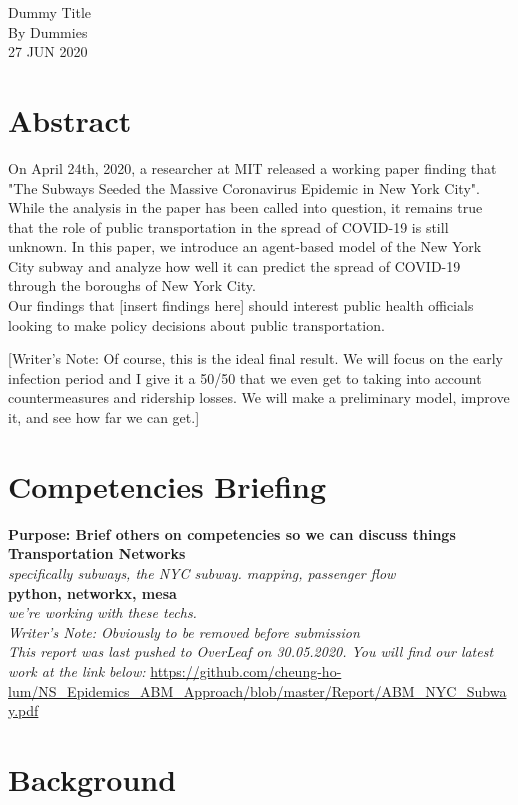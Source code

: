\documentclass[12pt, a4, epsf] {article}
\theoremstyle{plain}
\theoremstyle{definition}
\begin{document}
\begin{center}

{\Large Dummy Title\\}
By Dummies \\
27 JUN 2020
\end{center}

\section*{Abstract}
On April 24th, 2020, a researcher at MIT released a working paper finding that "The Subways Seeded the Massive Coronavirus Epidemic in New York City". While the analysis in the paper has been called into question, it remains true that the role of public transportation in the spread of COVID-19 is still unknown. In this paper, we introduce an agent-based model of the New York City subway and analyze how well it can predict the spread of COVID-19 through the boroughs of New York City.\\

Our findings that [insert findings here] should interest public health officials looking to make policy decisions about public transportation.

[Writer's Note: Of course, this is the ideal final result. We will focus on the early infection period and I give it a 50/50 that we even get to taking into account countermeasures and ridership losses. We will make a preliminary model, improve it, and see how far we can get.]

\section*{Competencies Briefing}
\textbf{Purpose: Brief others on competencies so we can discuss things\\}
\textbf{Transportation Networks\\}
\textit{specifically subways, the NYC subway. mapping, passenger flow\\}
\textbf{python, networkx, mesa\\}
\textit{we're working with these techs.\\}
\textit{Writer's Note: Obviously to be removed before submission\\}
\textit{This report was last pushed to OverLeaf on 30.05.2020. You will find our latest work at the link below:}
\url{https://github.com/cheung-ho-lum/NS_Epidemics_ABM_Approach/blob/master/Report/ABM_NYC_Subway.pdf}

\section*{Background}
\end{document}
